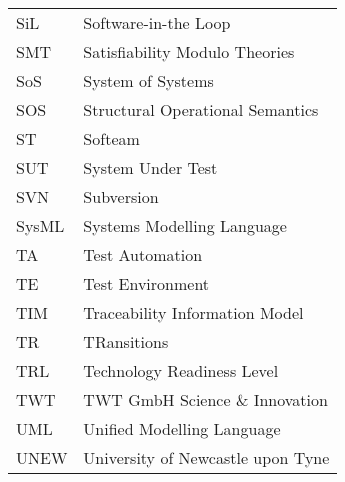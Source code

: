 \begin{longtable}{ll}
SiL	& Software-in-the Loop\\
SMT & Satisfiability Modulo Theories \\
SoS     &System of Systems\\
SOS     &Structural Operational Semantics\\
ST      &Softeam\\
SUT     &System Under Test\\
SVN	&Subversion\\
SysML	&Systems Modelling Language\\
TA      &Test Automation\\
TE & Test Environment\\
TIM & Traceability Information Model\\
TR & TRansitions \\
TRL     &Technology Readiness Level\\
TWT & TWT GmbH Science \& Innovation\\
UML	&Unified Modelling Language\\
UNEW	&University of Newcastle upon Tyne\\

\end{longtable}
